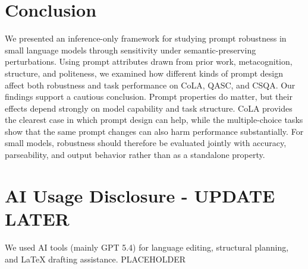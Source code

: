 \documentclass[11pt]{article}
\begin{document}
\section{Conclusion}

We presented an inference-only framework for studying prompt robustness in small language models through sensitivity under semantic-preserving perturbations. Using prompt attributes drawn from prior work, metacognition, structure, and politeness, we examined how different kinds of prompt design affect both robustness and task performance on CoLA, QASC, and CSQA. Our findings support a cautious conclusion. Prompt properties do matter, but their effects depend strongly on model capability and task structure. CoLA provides the clearest case in which prompt design can help, while the multiple-choice tasks show that the same prompt changes can also harm performance substantially. For small models, robustness should therefore be evaluated jointly with accuracy, parseability, and output behavior rather than as a standalone property.

\section*{AI Usage Disclosure - UPDATE LATER}

We used AI tools (mainly GPT 5.4) for language editing, structural planning, and LaTeX drafting assistance. PLACEHOLDER


\end{document}
